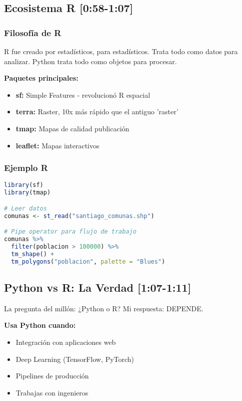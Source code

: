 \documentclass[11pt,a4paper]{article}
\newcommand{\tiempo}[1]{\textcolor{timecolor}{\textbf{[#1]}}}
\newcommand{\decir}[1]{\begin{tcolorbox}[colback=blue!5,colframe=usachblue,title={DECIR}]#1\end{tcolorbox}}
\begin{document}
\subsection{Ecosistema R \tiempo{0:58-1:07}}

\subsubsection{Filosofía de R}

\decir{R fue creado por estadísticos, para estadísticos. Trata todo como datos para analizar. Python trata todo como objetos para procesar.}

\textbf{Paquetes principales:}
\begin{itemize}
    \item \textbf{sf:} Simple Features - revolucionó R espacial
    \item \textbf{terra:} Raster, 10x más rápido que el antiguo 'raster'
    \item \textbf{tmap:} Mapas de calidad publicación
    \item \textbf{leaflet:} Mapas interactivos
\end{itemize}

\subsubsection{Ejemplo R}

\begin{lstlisting}[language=R]
library(sf)
library(tmap)

# Leer datos
comunas <- st_read("santiago_comunas.shp")

# Pipe operator para flujo de trabajo
comunas %>%
  filter(poblacion > 100000) %>%
  tm_shape() +
  tm_polygons("poblacion", palette = "Blues")
\end{lstlisting}

\subsection{Python vs R: La Verdad \tiempo{1:07-1:11}}

\decir{La pregunta del millón: ¿Python o R? Mi respuesta: DEPENDE.}

\textbf{Usa Python cuando:}
\begin{itemize}
    \item Integración con aplicaciones web
    \item Deep Learning (TensorFlow, PyTorch)
    \item Pipelines de producción
    \item Trabajas con ingenieros
\end{itemize}
\end{document}
